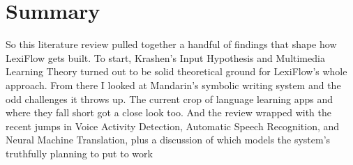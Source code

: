 \section{Summary}So this literature review pulled together a handful of findings that shape how LexiFlow gets built. To start, Krashen's Input Hypothesis and Multimedia Learning Theory turned out to be solid theoretical ground for LexiFlow's whole approach. From there I looked at Mandarin's symbolic writing system and the odd challenges it throws up. The current crop of language learning apps and where they fall short got a close look too. And the review wrapped with the recent jumps in Voice Activity Detection, Automatic Speech Recognition, and Neural Machine Translation, plus a discussion of which models the system's truthfully planning to put to work %
